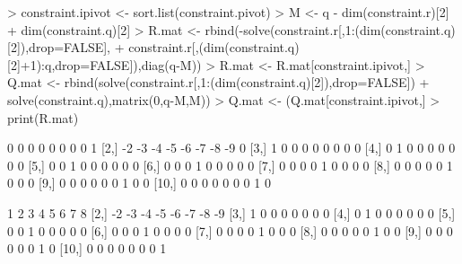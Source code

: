\documentclass[a4paper]{book}
\begin{document}
\begin{Schunk}
\begin{Sinput}
> 	constraint.ipivot <- sort.list(constraint.pivot)
> 	M <- q - dim(constraint.r)[2] + dim(constraint.q)[2]
> 	R.mat <- rbind(-solve(constraint.r[,1:(dim(constraint.q)[2]),drop=FALSE],
+ 		constraint.r[,(dim(constraint.q)[2]+1):q,drop=FALSE]),diag(q-M))
> 	R.mat <- R.mat[constraint.ipivot,] %
> 	Q.mat <- rbind(solve(constraint.r[,1:(dim(constraint.q)[2]),drop=FALSE]) %
+ 		solve(constraint.q),matrix(0,q-M,M)) 
> 	Q.mat <- (Q.mat[constraint.ipivot,] %
>   print(R.mat)
\end{Sinput}
\begin{Soutput}
      [,1] [,2] [,3] [,4] [,5] [,6] [,7] [,8] [,9]
 [1,]    0    0    0    0    0    0    0    0    1
 [2,]   -2   -3   -4   -5   -6   -7   -8   -9    0
 [3,]    1    0    0    0    0    0    0    0    0
 [4,]    0    1    0    0    0    0    0    0    0
 [5,]    0    0    1    0    0    0    0    0    0
 [6,]    0    0    0    1    0    0    0    0    0
 [7,]    0    0    0    0    1    0    0    0    0
 [8,]    0    0    0    0    0    1    0    0    0
 [9,]    0    0    0    0    0    0    1    0    0
[10,]    0    0    0    0    0    0    0    1    0
\end{Soutput}
\begin{Soutput}
      [,1] [,2] [,3] [,4] [,5] [,6] [,7] [,8]
 [1,]    1    2    3    4    5    6    7    8
 [2,]   -2   -3   -4   -5   -6   -7   -8   -9
 [3,]    1    0    0    0    0    0    0    0
 [4,]    0    1    0    0    0    0    0    0
 [5,]    0    0    1    0    0    0    0    0
 [6,]    0    0    0    1    0    0    0    0
 [7,]    0    0    0    0    1    0    0    0
 [8,]    0    0    0    0    0    1    0    0
 [9,]    0    0    0    0    0    0    1    0
[10,]    0    0    0    0    0    0    0    1
\end{Soutput}
\end{Schunk}
\end{document}
